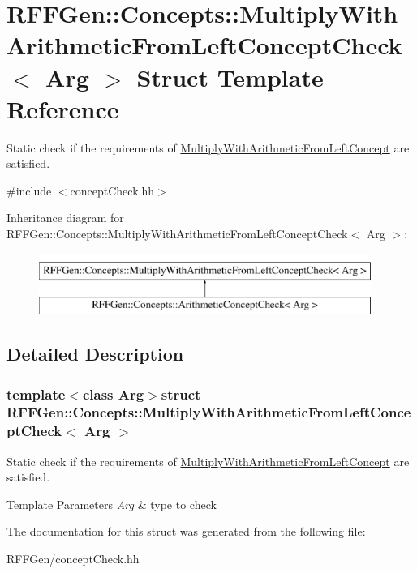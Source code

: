 \hypertarget{structRFFGen_1_1Concepts_1_1MultiplyWithArithmeticFromLeftConceptCheck}{\section{R\-F\-F\-Gen\-:\-:Concepts\-:\-:Multiply\-With\-Arithmetic\-From\-Left\-Concept\-Check$<$ Arg $>$ Struct Template Reference}
\label{structRFFGen_1_1Concepts_1_1MultiplyWithArithmeticFromLeftConceptCheck}
}


Static check if the requirements of \hyperlink{structRFFGen_1_1Concepts_1_1MultiplyWithArithmeticFromLeftConcept}{Multiply\-With\-Arithmetic\-From\-Left\-Concept} are satisfied.  




{\ttfamily \#include $<$concept\-Check.\-hh$>$}

Inheritance diagram for R\-F\-F\-Gen\-:\-:Concepts\-:\-:Multiply\-With\-Arithmetic\-From\-Left\-Concept\-Check$<$ Arg $>$\-:\begin{figure}[H]
\begin{center}
\leavevmode
\includegraphics[height=2.000000cm]{structRFFGen_1_1Concepts_1_1MultiplyWithArithmeticFromLeftConceptCheck}
\end{center}
\end{figure}


\subsection{Detailed Description}
\subsubsection*{template$<$class Arg$>$struct R\-F\-F\-Gen\-::\-Concepts\-::\-Multiply\-With\-Arithmetic\-From\-Left\-Concept\-Check$<$ Arg $>$}

Static check if the requirements of \hyperlink{structRFFGen_1_1Concepts_1_1MultiplyWithArithmeticFromLeftConcept}{Multiply\-With\-Arithmetic\-From\-Left\-Concept} are satisfied. 


\begin{DoxyTemplParams}{Template Parameters}
{\em Arg} & type to check \\
\hline
\end{DoxyTemplParams}


The documentation for this struct was generated from the following file\-:\begin{DoxyCompactItemize}
\item 
R\-F\-F\-Gen/concept\-Check.\-hh\end{DoxyCompactItemize}

